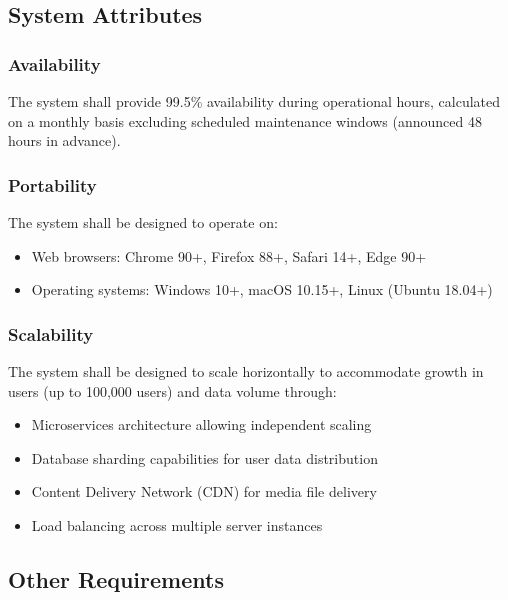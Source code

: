 \documentclass[12pt,a4paper]{article}
\begin{document}
\subsection{System Attributes}

\subsubsection{Availability}
The system shall provide 99.5\% availability during operational hours, calculated on a monthly basis excluding scheduled maintenance windows (announced 48 hours in advance).

\subsubsection{Portability}
The system shall be designed to operate on:
\begin{itemize}
    \item Web browsers: Chrome 90+, Firefox 88+, Safari 14+, Edge 90+
    \item Operating systems: Windows 10+, macOS 10.15+, Linux (Ubuntu 18.04+)
\end{itemize}

\subsubsection{Scalability}
The system shall be designed to scale horizontally to accommodate growth in users (up to 100,000 users) and data volume through:
\begin{itemize}
    \item Microservices architecture allowing independent scaling
    \item Database sharding capabilities for user data distribution
    \item Content Delivery Network (CDN) for media file delivery
    \item Load balancing across multiple server instances
\end{itemize}


\subsection{Other Requirements}
\end{document}
